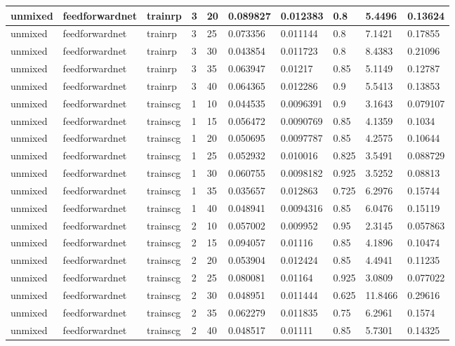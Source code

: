 \begin{longtable}{lllllllll}
unmixed & feedforwardnet & trainrp & 3 & 20 & 0.089827 & 0.012383 & 0.8 & 5.4496 & 0.13624 \\ \hline 
unmixed & feedforwardnet & trainrp & 3 & 25 & 0.073356 & 0.011144 & 0.8 & 7.1421 & 0.17855 \\ \hline 
unmixed & feedforwardnet & trainrp & 3 & 30 & 0.043854 & 0.011723 & 0.8 & 8.4383 & 0.21096 \\ \hline 
unmixed & feedforwardnet & trainrp & 3 & 35 & 0.063947 & 0.01217 & 0.85 & 5.1149 & 0.12787 \\ \hline 
unmixed & feedforwardnet & trainrp & 3 & 40 & 0.064365 & 0.012286 & 0.9 & 5.5413 & 0.13853 \\ \hline 
unmixed & feedforwardnet & trainscg & 1 & 10 & 0.044535 & 0.0096391 & 0.9 & 3.1643 & 0.079107 \\ \hline 
unmixed & feedforwardnet & trainscg & 1 & 15 & 0.056472 & 0.0090769 & 0.85 & 4.1359 & 0.1034 \\ \hline 
unmixed & feedforwardnet & trainscg & 1 & 20 & 0.050695 & 0.0097787 & 0.85 & 4.2575 & 0.10644 \\ \hline 
unmixed & feedforwardnet & trainscg & 1 & 25 & 0.052932 & 0.010016 & 0.825 & 3.5491 & 0.088729 \\ \hline 
unmixed & feedforwardnet & trainscg & 1 & 30 & 0.060755 & 0.0098182 & 0.925 & 3.5252 & 0.08813 \\ \hline 
unmixed & feedforwardnet & trainscg & 1 & 35 & 0.035657 & 0.012863 & 0.725 & 6.2976 & 0.15744 \\ \hline 
unmixed & feedforwardnet & trainscg & 1 & 40 & 0.048941 & 0.0094316 & 0.85 & 6.0476 & 0.15119 \\ \hline 
unmixed & feedforwardnet & trainscg & 2 & 10 & 0.057002 & 0.009952 & 0.95 & 2.3145 & 0.057863 \\ \hline 
unmixed & feedforwardnet & trainscg & 2 & 15 & 0.094057 & 0.01116 & 0.85 & 4.1896 & 0.10474 \\ \hline 
unmixed & feedforwardnet & trainscg & 2 & 20 & 0.053904 & 0.012424 & 0.85 & 4.4941 & 0.11235 \\ \hline 
unmixed & feedforwardnet & trainscg & 2 & 25 & 0.080081 & 0.01164 & 0.925 & 3.0809 & 0.077022 \\ \hline 
unmixed & feedforwardnet & trainscg & 2 & 30 & 0.048951 & 0.011444 & 0.625 & 11.8466 & 0.29616 \\ \hline 
unmixed & feedforwardnet & trainscg & 2 & 35 & 0.062279 & 0.011835 & 0.75 & 6.2961 & 0.1574 \\ \hline 
unmixed & feedforwardnet & trainscg & 2 & 40 & 0.048517 & 0.01111 & 0.85 & 5.7301 & 0.14325 \\ \hline 

\end{longtable}
